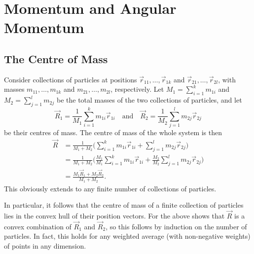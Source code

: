 \documentclass[article, a4paper, 11pt, oneside]{memoir}
\title{\doctitle}
\author{\docauthor}
\numberwithin{equation}{chapter}
\begin{document}
\maketitle


\addtocounter{chapter}{2}
\chapter{Momentum and Angular Momentum}

\addtocounter{section}{2}
\section{The Centre of Mass}

\begin{remarkbreak}
    Consider collections of particles at positions $\vec{r}_{11}, \ldots, \vec{r}_{1k}$ and $\vec{r}_{21}, \ldots, \vec{r}_{2l}$, with masses $m_{11}, \ldots, m_{1k}$ and $m_{21}, \ldots, m_{2l}$, respectively. Let $M_1 = \sum_{i=1}^k m_{1i}$ and $M_2 = \sum_{j=1}^l m_{2j}$ be the total masses of the two collections of particles, and let
    \begin{equation*}
        \vec{R}_1
            = \frac{1}{M_1} \sum_{i=1}^k m_{1i} \vec{r}_{1i}
        \quad \text{and} \quad
        \vec{R}_2
            = \frac{1}{M_2} \sum_{j=1}^l m_{2j} \vec{r}_{2j}
    \end{equation*}
    be their centres of mass. The centre of mass of the whole system is then
    \begin{align*}
        \vec{R}
            &= \frac{1}{M_1 + M_2} \biggl( \sum_{i=1}^k m_{1i} \vec{r}_{1i} + \sum_{j=1}^l m_{2j} \vec{r}_{2j} \biggr) \\
            &= \frac{1}{M_1 + M_2} \biggl( \frac{M_1}{M_1} \sum_{i=1}^k m_{1i} \vec{r}_{1i} + \frac{M_2}{M_2} \sum_{j=1}^l m_{2j} \vec{r}_{2j} \biggr) \\
            &= \frac{M_1 \vec{R}_1 + M_2 \vec{R}_2}{M_1 + M_2}.
    \end{align*}
    This obviously extends to any finite number of collections of particles.

    In particular, it follows that the centre of mass of a finite collection of particles lies in the convex hull of their position vectors. For the above shows that $\vec{R}$ is a convex combination of $\vec{R}_1$ and $\vec{R}_2$, so this follows by induction on the number of particles. In fact, this holds for any weighted average (with non-negative weights) of points in any dimension.
\end{remarkbreak}
\end{document}
